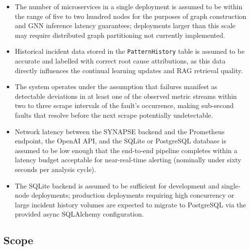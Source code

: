 \begin{itemize}
    \item The number of microservices in a single deployment is assumed to be within the range of five to two hundred nodes for the purposes of graph construction and GNN inference latency guarantees; deployments larger than this scale may require distributed graph partitioning not currently implemented.

    \item Historical incident data stored in the \texttt{PatternHistory} table is assumed to be accurate and labelled with correct root cause attributions, as this data directly influences the continual learning updates and RAG retrieval quality.

    \item The system operates under the assumption that failures manifest as detectable deviations in at least one of the observed metric streams within two to three scrape intervals of the fault's occurrence, making sub-second faults that resolve before the next scrape potentially undetectable.

    \item Network latency between the SYNAPSE backend and the Prometheus endpoint, the OpenAI API, and the SQLite or PostgreSQL database is assumed to be low enough that the end-to-end pipeline completes within a latency budget acceptable for near-real-time alerting (nominally under sixty seconds per analysis cycle).

    \item The SQLite backend is assumed to be sufficient for development and single-node deployments; production deployments requiring high concurrency or large incident history volumes are expected to migrate to PostgreSQL via the provided async SQLAlchemy configuration.
\end{itemize}

\subsection{Scope}

